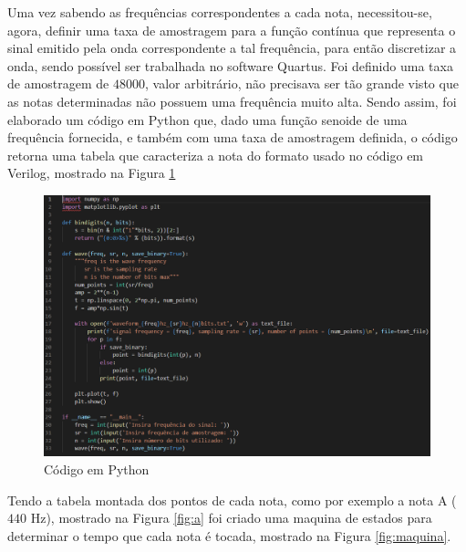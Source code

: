 \documentclass[14pt, oneside]{book}
\theoremstyle{definition}
\begin{document}
                    Uma vez sabendo as frequências correspondentes a cada nota, necessitou-se, agora, definir uma taxa de amostragem para a função contínua que representa o sinal emitido pela onda correspondente a tal frequência, para então discretizar a onda, sendo possível ser trabalhada no software Quartus. Foi definido uma taxa de amostragem de $48000$, valor arbitrário, não precisava ser tão grande visto que as notas determinadas não possuem uma frequência muito alta. Sendo assim, foi elaborado um código em Python que, dado uma função senoide de uma frequência fornecida, e também com uma taxa de amostragem definida, o código retorna uma tabela que caracteriza a nota do formato usado no código em Verilog, mostrado na Figura \ref{fig:python}
                    
                    \begin{figure}[!h]
                        \centering
                        \includegraphics[scale=0.7]{python.png}
                        \caption{Código em Python}
                        \label{fig:python}
                    \end{figure}
                    
                    Tendo a tabela montada dos pontos de cada nota, como por exemplo a nota A ($440$ Hz), mostrado na Figura \ref{fig:a} foi criado uma maquina de estados para determinar o tempo que cada nota é tocada, mostrado na Figura \ref{fig:maquina}.
                    
\end{document}
